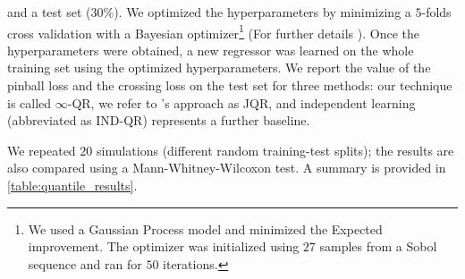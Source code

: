 and a test set (30\%). We optimized the hyperparameters by minimizing a
$5$-folds cross validation with a Bayesian optimizer\footnote{We used a
Gaussian Process model and minimized the Expected improvement. The optimizer
was initialized using $27$ samples from a Sobol sequence and ran for $50$
iterations.} (For further details ).
Once the hyperparameters were obtained, a new regressor was
learned on the whole training set using the optimized hyperparameters. We
report the value of the pinball loss and the crossing loss on the test set for
three methods: our technique is called $\infty$-\ac{QR}, we refer to
\citet{sangnier2016joint}'s approach as  \ac{JQR}, and independent learning
(abbreviated as IND-\ac{QR}) represents a further baseline. \par
%
%
We repeated $20$ simulations (different random training-test splits); the
results are also compared using a Mann-Whitney-Wilcoxon test. A summary is
provided in \cref{table:quantile_results}.
%
%
